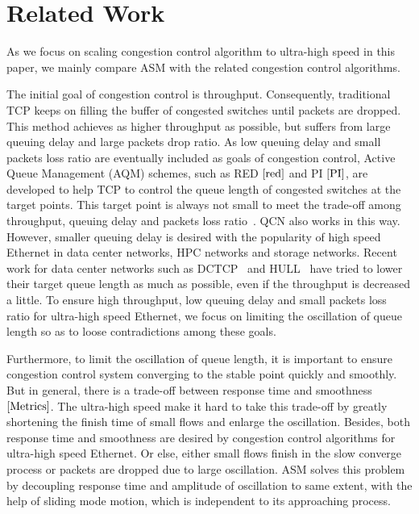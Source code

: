 \documentclass{sig-alternate-10pt}
\begin{document}
\section{Related Work}
As we focus on scaling congestion control algorithm to ultra-high speed in this paper, we mainly compare ASM with the related congestion control algorithms. 

The initial goal of congestion control is throughput. Consequently, traditional TCP keeps on filling the buffer of congested switches until packets are dropped. This method achieves as higher throughput as possible, but suffers from large queuing delay and large packets drop ratio. As low queuing delay and small packets loss ratio are eventually included as goals of congestion control, Active Queue Management (AQM) schemes, such as RED $\cite{red}$ and PI $\cite{PI}$, are developed to help TCP to control the queue length of congested switches at the target points. This target point is always not small to meet the trade-off among throughput, queuing delay and packets loss ratio~\cite{Metrics}. QCN also works in this way. However, smaller queuing delay is desired with the popularity of high speed Ethernet in data center networks, HPC networks and storage networks. Recent work for data center networks such as DCTCP~\cite{DCTCP} and HULL~\cite{HULL} have tried to lower their target queue length as much as possible, even if the throughput is decreased a little. To ensure high throughput, low queuing delay and small packets loss ratio for ultra-high speed Ethernet, we focus on limiting the oscillation of queue length so as to loose contradictions among these goals.


Furthermore, to limit the oscillation of queue length, it is important to ensure congestion control system converging to the stable point quickly and smoothly. But in general, there is a trade-off between response time and smoothness $\cite{Metrics}$. The ultra-high speed make it hard to take this trade-off by greatly shortening the finish time of small flows and enlarge the oscillation. Besides, both response time and smoothness are desired by congestion control algorithms for ultra-high speed Ethernet. Or else, either small flows finish in the slow converge process or packets are dropped due to large oscillation. ASM solves this problem by decoupling response time and amplitude of oscillation to same extent, with the help of sliding mode motion, which is independent to its approaching process.
\end{document}
